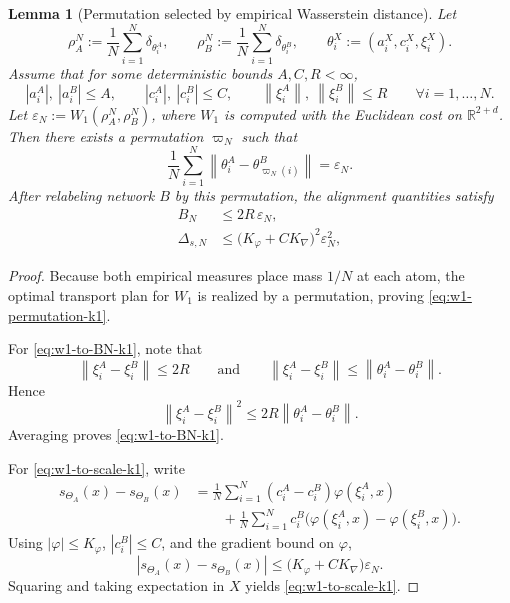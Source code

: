 \documentclass[11pt]{article}
\newtheorem{lemma}[theorem]{Lemma}
\theoremstyle{definition}
\newcommand{\R}{\mathbb{R}}
\newcommand{\norm}[1]{\left\lVert #1 \right\rVert}
\begin{document}
\begin{lemma}[Permutation selected by empirical Wasserstein distance]
\label{lem:w1-permutation-k1}
Let
\[
  \rho_A^N:=\frac1N\sum_{i=1}^N\delta_{\theta_i^A},
  \qquad
  \rho_B^N:=\frac1N\sum_{i=1}^N\delta_{\theta_i^B},
  \qquad
  \theta_i^X:=(a_i^X,c_i^X,\xi_i^X).
\]
Assume that for some deterministic bounds $A,C,R<\infty$,
\[
  |a_i^A|,\ |a_i^B|\le A,
  \qquad
  |c_i^A|,\ |c_i^B|\le C,
  \qquad
  \norm{\xi_i^A},\ \norm{\xi_i^B}\le R
  \qquad
  \forall i=1,\dots,N.
\]
Let $\varepsilon_N:=W_1(\rho_A^N,\rho_B^N)$, where $W_1$ is computed with the
Euclidean cost on $\R^{2+d}$. Then there exists a permutation $\varpi_N$ such
that
\begin{equation}
  \frac1N\sum_{i=1}^N\norm{\theta_i^A-\theta_{\varpi_N(i)}^B}
  =
  \varepsilon_N.
  \label{eq:w1-permutation-k1}
\end{equation}
After relabeling network $B$ by this permutation, the alignment quantities
satisfy
\begin{align}
  B_N
  &\le
  2R\,\varepsilon_N,
  \label{eq:w1-to-BN-k1}
  \\
  \Delta_{s,N}
  &\le
  \bigl(K_\varphi+CK_{\nabla}\bigr)^2\varepsilon_N^2,
  \label{eq:w1-to-scale-k1}
\end{align}
\end{lemma}

\begin{proof}
Because both empirical measures place mass $1/N$ at each atom, the optimal
transport plan for $W_1$ is realized by a permutation, proving
\eqref{eq:w1-permutation-k1}.

For \eqref{eq:w1-to-BN-k1}, note that
\[
  \norm{\xi_i^A-\xi_i^B}\le 2R
  \qquad\text{and}\qquad
  \norm{\xi_i^A-\xi_i^B}\le \norm{\theta_i^A-\theta_i^B}.
\]
Hence
\[
  \norm{\xi_i^A-\xi_i^B}^2
  \le
  2R\norm{\theta_i^A-\theta_i^B}.
\]
Averaging proves \eqref{eq:w1-to-BN-k1}.

For \eqref{eq:w1-to-scale-k1}, write
\begin{align*}
  s_{\Theta_A}(x)-s_{\Theta_B}(x)
  &=
  \frac1N\sum_{i=1}^N
  (c_i^A-c_i^B)\varphi(\xi_i^A,x)
  \\
  &\qquad
  +
  \frac1N\sum_{i=1}^N
  c_i^B\bigl(\varphi(\xi_i^A,x)-\varphi(\xi_i^B,x)\bigr).
\end{align*}
Using $|\varphi|\le K_\varphi$, $|c_i^B|\le C$, and the gradient bound on
$\varphi$,
\[
  |s_{\Theta_A}(x)-s_{\Theta_B}(x)|
  \le
  \bigl(K_\varphi+CK_{\nabla}\bigr)\varepsilon_N.
\]
Squaring and taking expectation in $X$ yields \eqref{eq:w1-to-scale-k1}.
\end{proof}
\end{document}
